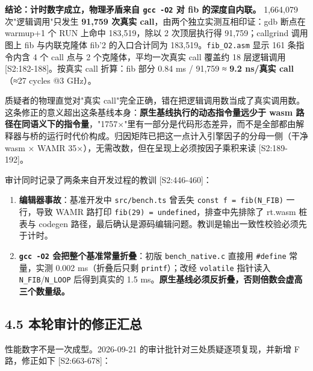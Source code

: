 \documentclass[11pt, a4paper]{article}
\begin{document}
\textbf{结论：计时数字成立，物理矛盾来自 \texttt{gcc -O2} 对 fib 的深度自内联。} 1,664,079 次"逻辑调用"只发生 \textbf{91,759 次真实 call}，由两个独立实测互相印证：gdb 断点在 warmup+1 个 RUN 上命中 183,519，除以 2 次顶层执行得 91,759；callgrind 调用图上 fib 与内联克隆体 fib'2 的入口合计同为 183,519。\texttt{fib\_O2.asm} 显示 161 条指令内含 4 个 call 点与 2 个克隆体，平均一次真实 call 覆盖约 18 层逻辑调用 [S2:182-188]。按真实 call 折算：fib 部分 0.84 ms / 91,759 ≈ \textbf{9.2 ns/真实 call}（≈27 cycles @3 GHz）。


质疑者的物理直觉对"真实 call"完全正确，错在把逻辑调用数当成了真实调用数。这条修正的意义超出这条基线本身：\textbf{原生基线执行的动态指令量远少于 wasm 路径在同语义下的指令量}，"1757×"里有一部分是代码形态差异，而不是全部都由解释器与桥的运行时代价构成。归因矩阵已把这一点计入引擎因子的分母一侧（干净 wasm × WAMR 35×），无需改数，但在呈现上必须按因子乘积来读 [S2:189-192]。


审计同时记录了两条来自开发过程的教训 [S2:446-460]：


\begin{enumerate}
\item \textbf{编辑器事故}：基准开发中 \texttt{src/bench.ts} 曾丢失 \texttt{const f = fib(N\_FIB)} 一行，导致 WAMR 路打印 \texttt{fib(29) = undefined}，排查中先排除了 rt.wasm 桩表与 codegen 路径，最后确认是源码编辑问题。教训是输出一致性校验必须先于计时。
\item \textbf{\texttt{gcc -O2} 会把整个基准常量折叠}：初版 \texttt{bench\_native.c} 直接用 \texttt{\#define} 常量，实测 0.002 ms（折叠后只剩 \texttt{printf}）；改经 \texttt{volatile} 指针读入 \texttt{N\_FIB}/\texttt{N\_LOOP} 后得到真实的 1.5 ms。\textbf{原生基线必须反折叠，否则倍数会虚高三个数量级。}
\end{enumerate}

\subsection{4.5 本轮审计的修正汇总}

性能数字不是一次成型。2026-09-21 的审计批针对三处质疑逐项复现，并新增 F 路，修正如下 [S2:663-678]：
\end{document}
